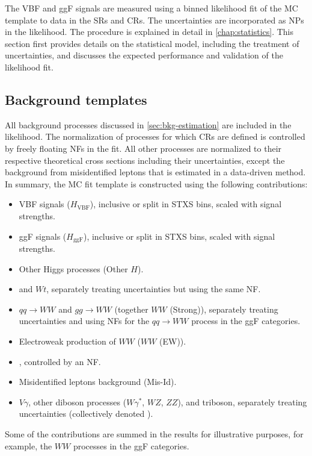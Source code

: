 
The VBF and ggF signals are measured using a binned likelihood fit of the MC template to data in the SRs and CRs. The uncertainties are incorporated as NPs in the likelihood. The procedure is explained in detail in \cref{chap:statistics}. 
This section first provides details on the statistical model, including the treatment of uncertainties, and discusses the expected performance and validation of the likelihood fit.


\subsection{Background templates}
All background processes discussed in \cref{sec:bkg-estimation} are included in the likelihood. 
The normalization of processes for which CRs are defined is controlled by freely floating NFs in the fit. All other processes are normalized to their respective theoretical cross sections including their uncertainties, except the background from misidentified leptons that is estimated in a data-driven method.
In summary, the MC fit template is constructed using the following contributions:
\begin{itemize}
    \item VBF signals ($H_{\mathrm{VBF}}$), inclusive or split in STXS bins, scaled with signal strengths.
    \item ggF signals ($H_{\mathrm{ggF}}$), inclusive or split in STXS bins, scaled with signal strengths.
    \item Other Higgs processes (Other $H$).
    \item \ttbar and $Wt$, separately treating uncertainties but using the same NF.
    \item $qq \to WW$ and $gg \to WW$ (together $WW$ (Strong)), separately treating uncertainties and using NFs for the $qq \to WW$ process in the ggF categories.
    \item Electroweak production of $WW$ ($WW$ (EW)).
    \item \Zgamma, controlled by an NF.
    \item Misidentified leptons background (Mis-Id).
    \item $V\gamma$, other diboson processes ($W\gamma^*$, $WZ$, $ZZ$), and triboson, separately treating uncertainties (collectively denoted \OtherVVV).
\end{itemize}
Some of the contributions are summed in the results for illustrative purposes, for example, the $WW$ processes in the ggF categories. 

